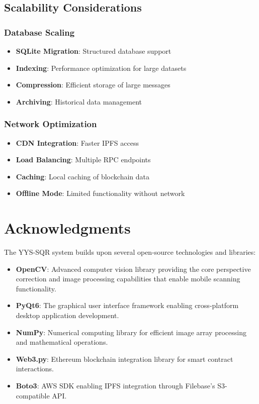 \documentclass[12pt,a4paper]{article}
\begin{document}
\subsection{Scalability Considerations}

\subsubsection{Database Scaling}
\begin{itemize}
    \item \textbf{SQLite Migration}: Structured database support
    \item \textbf{Indexing}: Performance optimization for large datasets
    \item \textbf{Compression}: Efficient storage of large messages
    \item \textbf{Archiving}: Historical data management
\end{itemize}

\subsubsection{Network Optimization}
\begin{itemize}
    \item \textbf{CDN Integration}: Faster IPFS access
    \item \textbf{Load Balancing}: Multiple RPC endpoints
    \item \textbf{Caching}: Local caching of blockchain data
    \item \textbf{Offline Mode}: Limited functionality without network
\end{itemize}

\section{Acknowledgments}

The YYS-SQR system builds upon several open-source technologies and libraries:

\begin{itemize}
    \item \textbf{OpenCV}: Advanced computer vision library providing the core perspective correction and image processing capabilities that enable mobile scanning functionality.
    \item \textbf{PyQt6}: The graphical user interface framework enabling cross-platform desktop application development.
    \item \textbf{NumPy}: Numerical computing library for efficient image array processing and mathematical operations.
    \item \textbf{Web3.py}: Ethereum blockchain integration library for smart contract interactions.
    \item \textbf{Boto3}: AWS SDK enabling IPFS integration through Filebase's S3-compatible API.
\end{itemize}
\end{document}
